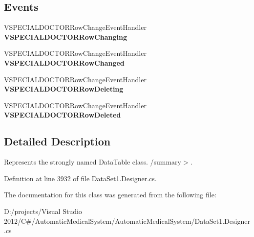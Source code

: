\subsection*{Events}
\begin{CompactItemize}
\item 
VSPECIALDOCTORRowChangeEventHandler \textbf{VSPECIALDOCTORRowChanging}\label{class_automatic_medical_system_1_1_data_set1_1_1_v_s_p_e_c_i_a_l_d_o_c_t_o_r_data_table_5e2b2a4ad03d5e10df2f21c5bf7eb5dc}

\item 
VSPECIALDOCTORRowChangeEventHandler \textbf{VSPECIALDOCTORRowChanged}\label{class_automatic_medical_system_1_1_data_set1_1_1_v_s_p_e_c_i_a_l_d_o_c_t_o_r_data_table_7ef393d8afa8bc054763d47d7ba2c7b6}

\item 
VSPECIALDOCTORRowChangeEventHandler \textbf{VSPECIALDOCTORRowDeleting}\label{class_automatic_medical_system_1_1_data_set1_1_1_v_s_p_e_c_i_a_l_d_o_c_t_o_r_data_table_d016fad9a327a51e2a20478beedf7faa}

\item 
VSPECIALDOCTORRowChangeEventHandler \textbf{VSPECIALDOCTORRowDeleted}\label{class_automatic_medical_system_1_1_data_set1_1_1_v_s_p_e_c_i_a_l_d_o_c_t_o_r_data_table_9f421db38f74c57f4d4991714cae671c}

\end{CompactItemize}


\subsection{Detailed Description}
Represents the strongly named DataTable class. /summary$>$. 

Definition at line 3932 of file DataSet1.Designer.cs.

The documentation for this class was generated from the following file:\begin{CompactItemize}
\item 
D:/projects/Visual Studio 2012/C\#/AutomaticMedicalSystem/AutomaticMedicalSystem/DataSet1.Designer.cs\end{CompactItemize}

